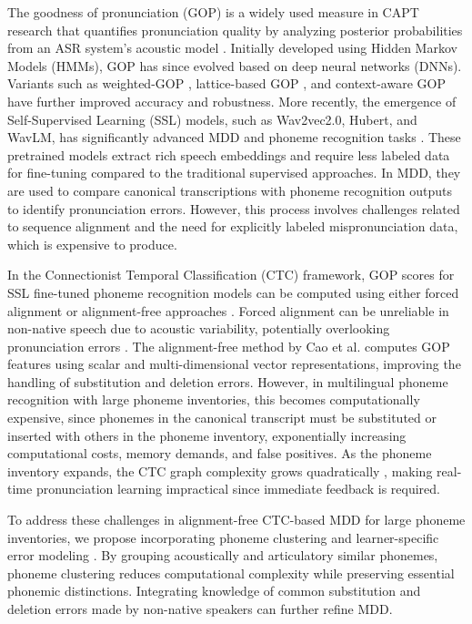 \documentclass{Interspeech}
\begin{document}
The goodness of pronunciation (GOP) is a widely used measure in CAPT research that quantifies pronunciation quality by analyzing posterior probabilities from an ASR system's acoustic model  \cite{witt2000phone, witt2000use}. Initially developed using Hidden Markov Models (HMMs), GOP has since evolved based on deep neural networks (DNNs). Variants such as weighted-GOP \cite{van2010using}, lattice-based GOP \cite{song2010lattice}, and context-aware GOP \cite{shi2020context} have further improved accuracy and robustness.
More recently, the emergence of Self-Supervised Learning (SSL) models, such as Wav2vec2.0, Hubert, and WavLM, has significantly advanced MDD and phoneme recognition tasks \cite{baevski2020wav2vec, hsu2021hubert, chen2022wavlm}. These pretrained models extract rich speech embeddings and require less labeled data for fine-tuning compared to the traditional supervised approaches. In MDD, they are used to compare canonical transcriptions with phoneme recognition outputs to identify pronunciation errors. However, this process involves challenges related to sequence alignment and the need for explicitly labeled mispronunciation data, which is expensive to produce. 

In the Connectionist Temporal Classification (CTC) framework, GOP scores for SSL fine-tuned phoneme recognition models can be computed using either forced alignment or alignment-free approaches \cite{medin2024self, cao2024framework}. Forced alignment can be unreliable in non-native speech due to acoustic variability, potentially overlooking pronunciation errors \cite{mathad2021impact}. The alignment-free method by Cao et al. \cite{cao2024framework} computes GOP features using scalar and multi-dimensional vector representations, improving the handling of substitution and deletion errors. However, in multilingual phoneme recognition with large phoneme inventories, this becomes computationally expensive, since phonemes in the canonical transcript must be substituted or inserted with others in the phoneme inventory, exponentially increasing computational costs, memory demands, and false positives. As the phoneme inventory expands, the CTC graph complexity grows quadratically \cite{laptev2021ctc}, making real-time pronunciation learning impractical since immediate feedback is required.

To address these challenges in alignment-free CTC-based MDD for large phoneme inventories, we propose incorporating phoneme clustering \cite{tak2010clustering,meng2009multilingual,oh2021hierarchical} and learner-specific error modeling \cite{cucchiarini2011error,kruitbosch2020pronunciation}. By grouping acoustically and articulatory similar phonemes, phoneme clustering reduces computational complexity while preserving essential phonemic distinctions. Integrating knowledge of common substitution and deletion errors made by non-native speakers can further refine MDD.
\end{document}
